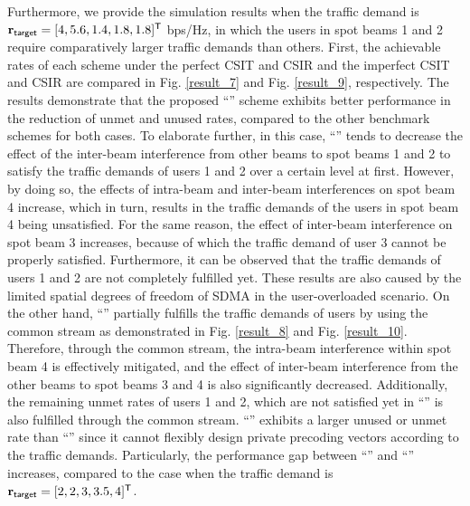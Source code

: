\documentclass[draftclsnofoot, onecolumn, comsoc, 12pt]{IEEEtran}
\begin{document}
{Furthermore, we provide the simulation results when the traffic demand is $\mathbf{r}_{\sf{target}}=[4, 5.6, 1.4, 1.8, 1.8]^{\sf{T}}$ bps/Hz, in which the users in spot beams 1 and 2 require comparatively larger traffic demands than others. }
First, the achievable rates of each scheme under the perfect CSIT and CSIR and the imperfect CSIT and CSIR are compared in Fig. \ref{result_7} and  Fig. \ref{result_9}, respectively. 
The results demonstrate that the proposed ``{}'' scheme exhibits better performance in the reduction of {unmet} and {unused rates}, compared to the other benchmark schemes for both cases.
To elaborate further, in this case, ``{}'' tends to decrease the effect of the inter-beam interference from other beams to spot beams 1 and 2 to satisfy the traffic demands of users 1 and 2 over a certain level at first.
However, by doing so, the effects of intra-beam and inter-beam interferences on spot beam 4 increase, which in turn, results in the traffic demands of the users in spot beam 4 being unsatisfied. 
For the same reason, the effect of inter-beam interference on spot beam 3 increases, because of which the traffic demand of user 3 cannot be properly satisfied. 
Furthermore, it can be observed that the traffic demands of users 1 and 2 are not completely fulfilled yet. 
These results are also caused by the limited {spatial degrees of freedom} of SDMA in the user-overloaded scenario.
On the other hand, ``{}'' partially fulfills the traffic demands of users by using the common stream as demonstrated in Fig. \ref{result_8} and Fig. \ref{result_10}. 
Therefore, through the common stream, the intra-beam interference within spot beam 4 is effectively mitigated, and the effect of inter-beam interference from the other beams to spot beams 3 and 4 is also significantly decreased. Additionally, the remaining {unmet rates} of users 1 and 2, which are not satisfied yet in ``{}'' is also fulfilled through the common stream.
``{}'' exhibits a larger {unused} or {unmet rate} than ``{}'' since it cannot flexibly design private precoding vectors according to the traffic demands. 
{Particularly, the performance gap between ``{}'' and ``{}'' increases, compared to the case when the traffic demand is
$\mathbf{r}_{\sf{target}} = [2,2,3,3.5,4]^{\sf{T}}$.} 
\end{document}

